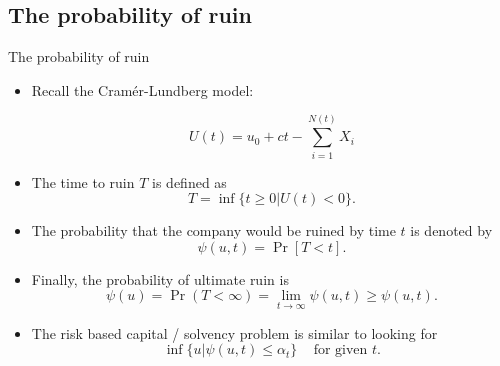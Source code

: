\documentclass[11pt]{beamer}
\begin{document}
\subsection{The probability of ruin}
\begin{frame}{The probability of ruin}

\begin{itemize}

\item Recall the Cram\'er-Lundberg model:

$$U(t)= u_0+ct - \sum_{i=1}^{N(t)}X_i$$

\item The time to ruin $T$ is defined as
$$T=\inf \{ t\ge 0 | U(t)<0\}.$$

\item The probability that the company would be ruined by time $t$ is denoted by
$$\psi(u,t)=\Pr[T<t].$$

\end{itemize}




\end{frame}
\begin{frame}

\begin{itemize}

\item Finally, the probability of \alert{ultimate} ruin is
$$\psi(u) =\Pr(T<\infty)= \lim_{t\rightarrow \infty} \psi(u,t) \ge \psi(u,t).$$

\vfill

\item The risk based capital / solvency problem is similar to looking for
$$\inf\{u|\psi(u,t)\le\alpha_t\}\;\;\;\text{ for given }t.$$

\end{itemize}



\end{frame}
\end{document}
